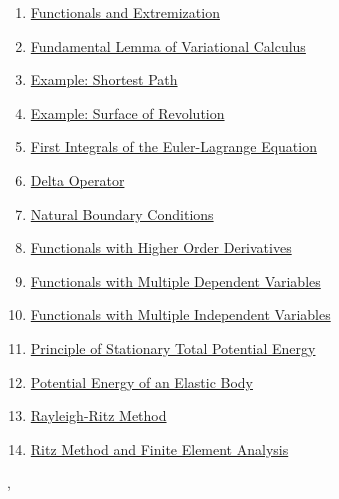 \documentclass[11pt]{article}
\renewcommand{\today}{\shortmonthname[\the\month] \the \day,  \the\year}
\begin{document}
\begin{enumerate}
	\item \href{https://mp.weixin.qq.com/s/r_SDt50UCSh38pvaN5c8EQ}{Functionals and Extremization}	%
	\item \href{https://mp.weixin.qq.com/s/a3DHUwl_Ms59Ryos_4ax9A}{Fundamental Lemma of Variational Calculus}	%
	\item \href{https://mp.weixin.qq.com/s/DbGWof3Wmw8NWIsELqlB8A}{Example: Shortest Path}	%
	\item \href{https://mp.weixin.qq.com/s/Dp-Jadj0aLF9qUkM_KNSOQ}{Example: Surface of Revolution}	%
	\item \href{https://mp.weixin.qq.com/s/Ilamv2QxtxzquzNSxoXYZg}{First Integrals of the Euler-Lagrange Equation}	%
	\item \href{https://mp.weixin.qq.com/s/cJM1FF-pgKg7_3BARtvd1w}{Delta Operator}	%
	\item \href{https://mp.weixin.qq.com/s/-qAZHabQvoQNW-osLY7NjQ}{Natural Boundary Conditions}	%
	\item \href{https://mp.weixin.qq.com/s/TJiTyKDHW_Pu8SwRe60mJw}{Functionals with Higher Order Derivatives}	%
	\item \href{https://mp.weixin.qq.com/s/O7rYcBOtqFn6XVu1BJT2qA}{Functionals with Multiple Dependent Variables}	%
	\item \href{https://mp.weixin.qq.com/s/ra-a53w77nJ1BhcjzGZe7g}{Functionals with Multiple Independent Variables}	%
	\item \href{https://mp.weixin.qq.com/s/M8W-QE2z9x2tKPIaK5UHQw}{Principle of Stationary Total Potential Energy}	%
	\item \href{https://mp.weixin.qq.com/s/ck3B_IF6NA7wpZCfDwxXrg}{Potential Energy of an Elastic Body}	%
	\item \href{https://mp.weixin.qq.com/s/EJBB0Rmr-DL6LasQAYT2tw}{Rayleigh-Ritz Method}	%
	\item \href{https://mp.weixin.qq.com/s/1hm_Dqdpd_N5qMKxJa1nXw}{Ritz Method and Finite Element Analysis}	%
\end{enumerate}

\begin{flushright}
	\tiny \today 
\end{flushright}
\end{document}
